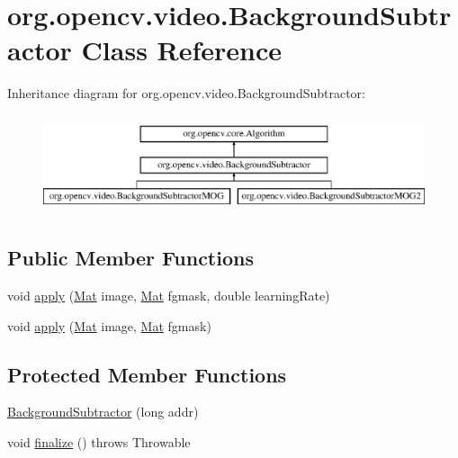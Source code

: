 \hypertarget{classorg_1_1opencv_1_1video_1_1_background_subtractor}{}\section{org.\+opencv.\+video.\+Background\+Subtractor Class Reference}
\label{classorg_1_1opencv_1_1video_1_1_background_subtractor}
Inheritance diagram for org.\+opencv.\+video.\+Background\+Subtractor\+:\begin{figure}[H]
\begin{center}
\leavevmode
\includegraphics[height=2.916667cm]{classorg_1_1opencv_1_1video_1_1_background_subtractor}
\end{center}
\end{figure}
\subsection*{Public Member Functions}
\begin{DoxyCompactItemize}
\item 
void \mbox{\hyperlink{classorg_1_1opencv_1_1video_1_1_background_subtractor_a290ed6795a4c1e74474c3046fc888c62}{apply}} (\mbox{\hyperlink{classorg_1_1opencv_1_1core_1_1_mat}{Mat}} image, \mbox{\hyperlink{classorg_1_1opencv_1_1core_1_1_mat}{Mat}} fgmask, double learning\+Rate)
\item 
void \mbox{\hyperlink{classorg_1_1opencv_1_1video_1_1_background_subtractor_a0789ad256c915e8ae06199a99e73cda9}{apply}} (\mbox{\hyperlink{classorg_1_1opencv_1_1core_1_1_mat}{Mat}} image, \mbox{\hyperlink{classorg_1_1opencv_1_1core_1_1_mat}{Mat}} fgmask)
\end{DoxyCompactItemize}
\subsection*{Protected Member Functions}
\begin{DoxyCompactItemize}
\item 
\mbox{\hyperlink{classorg_1_1opencv_1_1video_1_1_background_subtractor_a1d5f3d01bd917289c673cdfe056a8687}{Background\+Subtractor}} (long addr)
\item 
void \mbox{\hyperlink{classorg_1_1opencv_1_1video_1_1_background_subtractor_aa3a3526a938ecced2581fb34f93f0825}{finalize}} ()  throws Throwable 
\end{DoxyCompactItemize}
